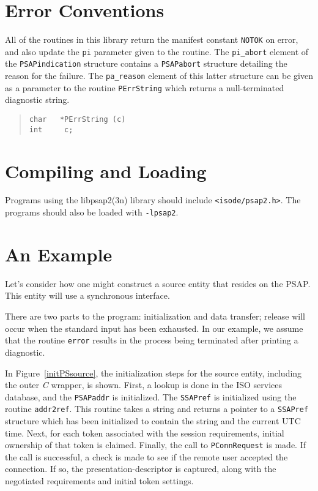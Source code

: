 \section	{Error Conventions}
All of the routines in this library return the manifest constant \verb"NOTOK"
on error,
and also update the \verb"pi" parameter given to the routine.
The \verb"pi_abort" element of the \verb"PSAPindication" structure contains a
\verb"PSAPabort" structure detailing the reason for the failure.
The \verb"pa_reason" element of this latter structure can be given as a
parameter to the routine \verb"PErrString" which returns a null-terminated
diagnostic string.
\begin{quote}\small\begin{verbatim}
char   *PErrString (c)
int     c;
\end{verbatim}\end{quote}

\section	{Compiling and Loading}
Programs using the \man libpsap2(3n) library should include
\verb"<isode/psap2.h>".
The programs should also be loaded with \verb"-lpsap2".

\section	{An Example}
Let's consider how one might construct a source entity that resides on the
PSAP.
This entity will use a synchronous interface.

There are two parts to the program:
initialization and data transfer;
release will occur when the standard input has been exhausted.
In our example,
we assume that the routine \verb"error" results in the process being
terminated after printing a diagnostic.

In Figure~\ref{initPSsource},
the initialization steps for the source entity,
including the outer {\em C\/} wrapper,
is shown.
First, a lookup is done in the ISO services database,
and the \verb"PSAPaddr" is initialized.
The \verb"SSAPref" is initialized using the routine
\verb"addr2ref".
This routine takes a string and returns a pointer to a \verb"SSAPref"
structure which has been initialized to contain the string and the current
UTC time.
Next, for each token associated with the session requirements,
initial ownership of that token is claimed.
Finally,
the call to \verb"PConnRequest" is made.
If the call is successful,
a check is made to see if the remote user accepted the connection.
If so,
the presentation-descriptor is captured,
along with the negotiated requirements and initial token settings.

